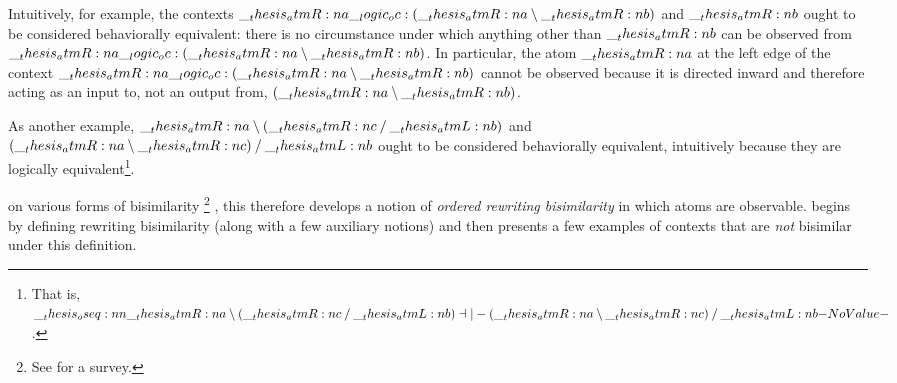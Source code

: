 
Intuitively, for example, the contexts $\__thesis_atmR:n {a} \__logic_oc: (\__thesis_atmR:n {a} \mathbin { \setminus } \__thesis_atmR:n {b})$ and $\__thesis_atmR:n {b}$ ought to be considered behaviorally equivalent: there is no circumstance under which anything other than $\__thesis_atmR:n {b}$ can be observed from $\__thesis_atmR:n {a} \__logic_oc: (\__thesis_atmR:n {a} \mathbin { \setminus } \__thesis_atmR:n {b})$.
In particular, the atom $\__thesis_atmR:n {a}$ at the left edge of the context $\__thesis_atmR:n {a} \__logic_oc: (\__thesis_atmR:n {a} \mathbin { \setminus } \__thesis_atmR:n {b})$ cannot be observed because it is directed inward and therefore acting as an input to, not an output from, $(\__thesis_atmR:n {a} \mathbin { \setminus } \__thesis_atmR:n {b})$.

As another example, $\__thesis_atmR:n {a} \mathbin { \setminus } (\__thesis_atmR:n {c} \mathbin { / } \__thesis_atmL:n {b})$ and $(\__thesis_atmR:n {a} \mathbin { \setminus } \__thesis_atmR:n {c}) \mathbin { / } \__thesis_atmL:n {b}$ ought to be considered behaviorally equivalent, intuitively because they are logically equivalent\footnote{That is, $\oseq{\atmR{a} \limp (\atmR{c} \pmir \atmL{b}) \dashv|- (\atmR{a} \limp \atmR{c}) \pmir \atmL{b}}$.}.





 on various forms of bisimilarity%
\footnote{See \textcite{??} for a survey.}%
, this  therefore develops a notion of \emph{ordered rewriting bisimilarity} in which atoms are observable.
%
 begins by defining rewriting bisimilarity (along with a few auxiliary notions) and then presents a few examples of contexts that are \emph{not} bisimilar under this definition.

